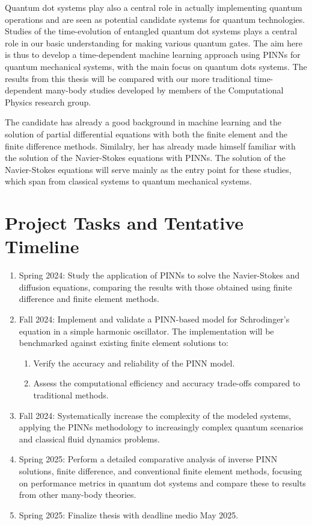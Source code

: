 \documentclass{article}
\begin{document}
Quantum dot systems play also a central role in actually implementing
quantum operations and are seen as potential candidate systems for
quantum technologies. Studies of the time-evolution of entangled
quantum dot systems plays a central role in our basic understanding
for making various quantum gates.
The aim here is thus to develop a time-dependent machine learning
approach using PINNs for quantum mechanical systems, with the main focus on quantum dots systems.
The results from this thesis will be compared with our more traditional time-dependent many-body studies developed by members of the Computational Physics research group.

The candidate has already a good background in machine learning and
the solution of partial differential equations with both the finite
element and the finite difference methods. Similalry, her has already
made himself familiar with the solution of the Navier-Stokes equations
with PINNs. The solution of the Navier-Stokes equations will serve
mainly as the entry point for these studies, which span from classical systems to quantum mechanical systems.


\section{Project Tasks and Tentative Timeline}

\begin{enumerate}
\item Spring 2024: Study the application of PINNs to solve the Navier-Stokes and diffusion equations, comparing the results with those obtained using finite difference and finite element methods.
\item Fall 2024: Implement and validate a PINN-based model for Schrodinger's equation in a simple harmonic oscillator. The implementation will be benchmarked against existing finite element solutions to:
  \begin{enumerate}
   \item Verify the accuracy and reliability of the PINN model.
   \item Assess the computational efficiency and accuracy trade-offs compared to traditional methods.
  \end{enumerate}
\item Fall 2024: Systematically increase the complexity of the modeled systems, applying the PINNs methodology to increasingly complex quantum scenarios and classical fluid dynamics problems.
\item Spring 2025: Perform a detailed comparative analysis of inverse PINN solutions, finite difference, and conventional finite element methods, focusing on performance metrics in  quantum dot systems and compare these to results from other many-body theories.
\item Spring 2025: Finalize thesis with deadline medio May 2025.
\end{enumerate}
\end{document}
